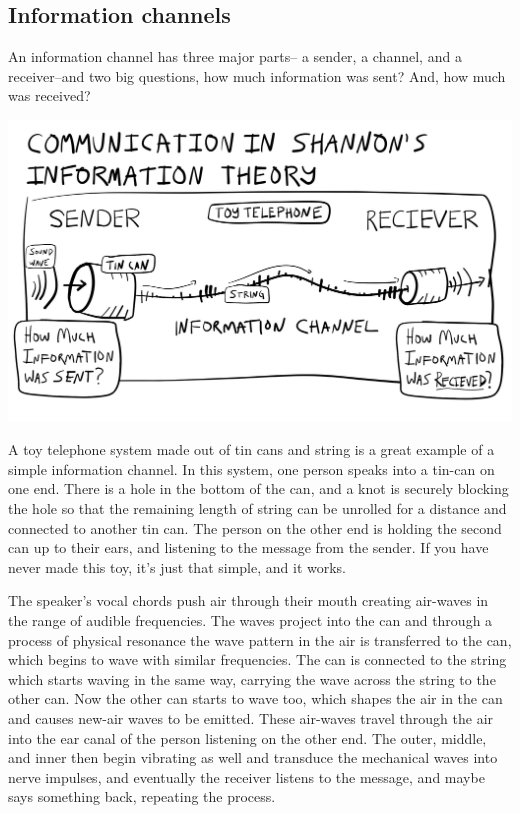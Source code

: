 \documentclass[
  oneside,
  12pt]{crumpbook}
\begin{document}
\hypertarget{information-channels}{%
\subsection{Information channels}\label{information-channels}}

An information channel has three major parts-- a sender, a channel, and a receiver--and two big questions, how much information was sent? And, how much was received?

\begin{center}\includegraphics[width=1\linewidth]{imgs/Shannon_info_channel} \end{center}

A toy telephone system made out of tin cans and string is a great example of a simple information channel. In this system, one person speaks into a tin-can on one end. There is a hole in the bottom of the can, and a knot is securely blocking the hole so that the remaining length of string can be unrolled for a distance and connected to another tin can. The person on the other end is holding the second can up to their ears, and listening to the message from the sender. If you have never made this toy, it's just that simple, and it works.

The speaker's vocal chords push air through their mouth creating air-waves in the range of audible frequencies. The waves project into the can and through a process of physical resonance the wave pattern in the air is transferred to the can, which begins to wave with similar frequencies. The can is connected to the string which starts waving in the same way, carrying the wave across the string to the other can. Now the other can starts to wave too, which shapes the air in the can and causes new-air waves to be emitted. These air-waves travel through the air into the ear canal of the person listening on the other end. The outer, middle, and inner then begin vibrating as well and transduce the mechanical waves into nerve impulses, and eventually the receiver listens to the message, and maybe says something back, repeating the process.
\end{document}
